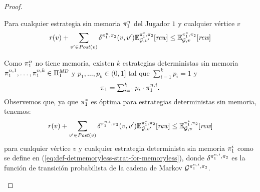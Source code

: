 \begin{proof}
  \begin{claim}
  Para cualquier estrategia sin memoria $\pi_{1}^n$ del Jugador $1$ y cualquier vértice $v$ 
  \begin{equation*}
    \mathit{r}(v) + \sum_{v' \in \mathit{Post}(v)} \delta^{\pi_{1}^n,\pi_{2}}(v, v') \mathbb{E}^{\pi^*_{1}, \pi_{2}}_{\mathcal{G},v'}[\textit{rew}] \leq \mathbb{E}^{\pi^*_{1}, \pi_{2}}_{\mathcal{G},v}[\textit{rew}]
  \end{equation*}
  \end{claim}
  \begin{proofofclaim}
    Como $\pi_{1}^n$ no tiene memoria, existen $k$ estrategias deterministas sin memoria
    $\pi_{1}^{n,1},\ldots,\pi_{1}^{n,k}\in\Pi^{\textit{MD}}_{1}$ y
    $p_1,\ldots,p_k \in(0,1]$ tal que $\sum_{i=1}^kp_i =1$ y 
    \begin{equation}\label{eq:def-detmemoryless-strat-for-memoryless}
      \pi_{1}=\textstyle\sum_{i=1}^k p_i\cdot\pi_{1}^{n,i}.
    \end{equation}
    Observemos que, ya que $\pi^*_{1}$ es óptima para estrategias deterministas sin memoria, tenemos:
    \begin{equation}\label{eq:semimarkov-to-detmemoryless:optimality}
      \mathit{r}(v) + \sum_{v' \in \mathit{Post}(v)} \delta^{\pi_{1}^{n,i},\pi_{2}}(v, v') \mathbb{E}^{\pi^*_{1}, \pi_{2}}_{\mathcal{G},v'}[\textit{rew}] \leq \mathbb{E}^{\pi^*_{1}, \pi_{2}}_{\mathcal{G},v}[\textit{rew}]
    \end{equation}
    para cualquier vértice $v$ y cualquier estrategia determinista sin memoria
    $\pi_{1}^i$ como se define en
    (\ref{eq:def-detmemoryless-strat-for-memoryless}), donde
    $\delta^{\pi_{1}^{n,i},\pi_{2}}$ es la función de transición probabilista de la cadena de Markov $\mathcal{G}^{\pi_{1}^{n,i},\pi_{2}}$.


\end{proofofclaim}
\end{proof}
